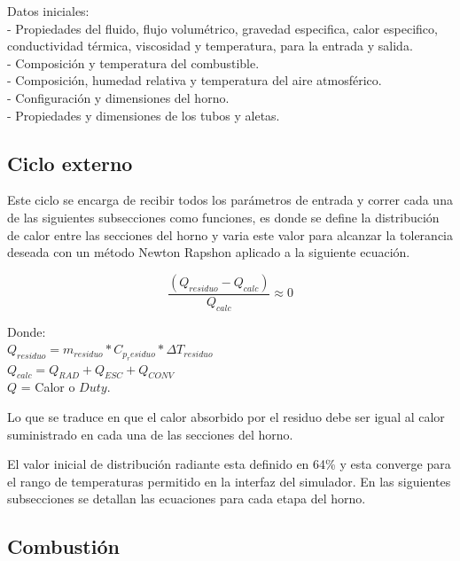 \par Datos iniciales:\\
- Propiedades del fluido, flujo volumétrico, gravedad especifica, calor especifico, conductividad térmica, viscosidad y temperatura, para la entrada y salida.\\
- Composición y temperatura del combustible.\\
- Composición, humedad relativa y temperatura del aire atmosférico.\\
- Configuración y dimensiones del horno.\\
- Propiedades y dimensiones de los tubos y aletas.

\subsection{Ciclo externo}

\par Este ciclo se encarga de recibir todos los parámetros de entrada y correr cada una de las siguientes subsecciones como funciones, es donde se define la distribución de calor entre las secciones del horno y varia este valor para alcanzar la tolerancia deseada con un método Newton Rapshon aplicado a la siguiente ecuación.

\begin{equation}
\label{eq:ciclo_externo}
\frac{(Q_{residuo} - Q_{calc})}{Q_{calc}} \approx 0
\end{equation}
\par Donde:\\
$Q_{residuo} = m_{residuo} * C_{p_residuo} * {\Delta}T_{residuo}$ \\
$Q_{calc} = Q_{RAD} + Q_{ESC} + Q_{CONV}$ \\
$Q$ = Calor o $Duty$. \\

\par Lo que se traduce en que el calor absorbido por el residuo debe ser igual al calor suministrado en cada una de las secciones del horno.

\par El valor inicial de distribución radiante esta definido en 64\% y esta converge para el rango de temperaturas permitido en la interfaz del simulador. En las siguientes subsecciones se detallan las ecuaciones para cada etapa del horno.

\subsection{Combustión}

